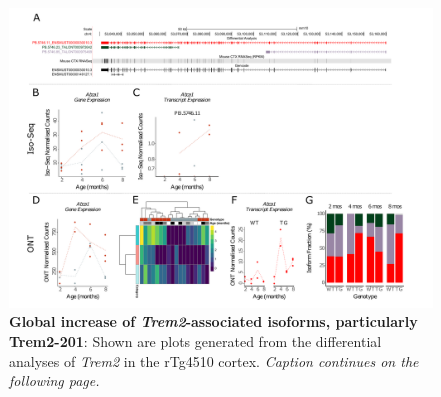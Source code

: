 \begin{landscape}
	\begin{figure}[htp]
		\begin{center}
			\includegraphics[page=18,trim={0 0.5cm 0 1.5cm},scale =0.85]{Figures/TargetGene_DifferentialAnalysis.pdf}
		\end{center}
		\captionsetup{width=1.5\textwidth}
		\caption[Differential Isoform Expression: Changes in transcript expression of isoforms associated with \textit{Trem2}]%
		{\textbf{Global increase of \textit{Trem2}-associated isoforms, particularly Trem2-201}: Shown are plots generated from the differential analyses of \textit{Trem2} in the rTg4510 cortex. \textit{Caption continues on the following page.}}   
		\label{fig:trem2_diff_analysis}
	\end{figure}
\end{landscape}
